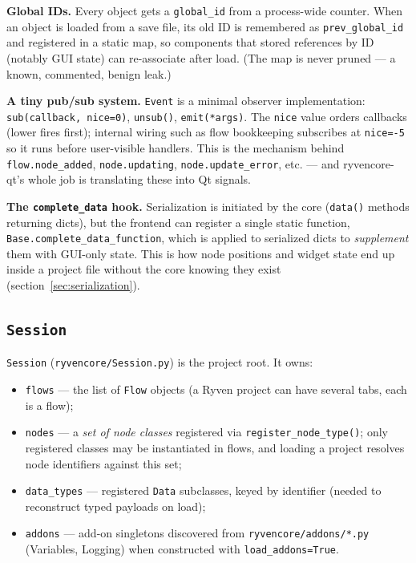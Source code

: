 \documentclass[10pt,a4paper]{article}
\newcommand{\code}[1]{\texttt{\small #1}}
\begin{document}
\textbf{Global IDs.} Every object gets a \code{global\_id} from a process-wide counter.
When an object is loaded from a save file, its old ID is remembered as
\code{prev\_global\_id} and registered in a static map, so components that stored
references by ID (notably GUI state) can re-associate after load. (The map is never
pruned --- a known, commented, benign leak.)

\textbf{A tiny pub/sub system.} \code{Event} is a minimal observer implementation:
\code{sub(callback, nice=0)}, \code{unsub()}, \code{emit(*args)}. The \code{nice}
value orders callbacks (lower fires first); internal wiring such as flow bookkeeping
subscribes at \code{nice=-5} so it runs before user-visible handlers. This is the
mechanism behind \code{flow.node\_added}, \code{node.updating},
\code{node.update\_error}, etc. --- and ryvencore-qt's whole job is translating these
into Qt signals.

\textbf{The \code{complete\_data} hook.} Serialization is initiated by the core
(\code{data()} methods returning dicts), but the frontend can register a single static
function, \code{Base.complete\_data\_function}, which is applied to serialized dicts to
\emph{supplement} them with GUI-only state. This is how node positions and widget state
end up inside a project file without the core knowing they exist
(section~\ref{sec:serialization}).

\subsection{\texttt{Session}}

\code{Session} (\code{ryvencore/Session.py}) is the project root. It owns:

\begin{itemize}
\item \code{flows} --- the list of \code{Flow} objects (a Ryven project can have several
      tabs, each is a flow);
\item \code{nodes} --- a \emph{set of node classes} registered via
      \code{register\_node\_type()}; only registered classes may be instantiated in
      flows, and loading a project resolves node identifiers against this set;
\item \code{data\_types} --- registered \code{Data} subclasses, keyed by identifier
      (needed to reconstruct typed payloads on load);
\item \code{addons} --- add-on singletons discovered from
      \code{ryvencore/addons/*.py} (Variables, Logging) when constructed with
      \code{load\_addons=True}.
\end{itemize}
\end{document}
